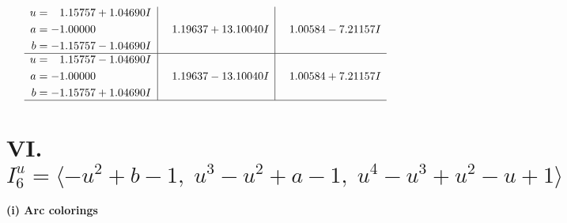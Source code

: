\documentclass[1p]{elsarticle_modified}
\theoremstyle{definition}
\begin{document}
$$\begin{array}{c|c|c}
\begin{aligned}
u &= \phantom{-}1.15757 + 1.04690 I \\
a &= -1.00000\phantom{ +0.000000I} \\
b &= -1.15757 - 1.04690 I\end{aligned}
 & \phantom{-}1.19637 + 13.10040 I & \phantom{-}1.00584 - 7.21157 I \\ \hline\begin{aligned}
u &= \phantom{-}1.15757 - 1.04690 I \\
a &= -1.00000\phantom{ +0.000000I} \\
b &= -1.15757 + 1.04690 I\end{aligned}
 & \phantom{-}1.19637 - 13.10040 I & \phantom{-}1.00584 + 7.21157 I\\
 \hline 
 \end{array}$$\newpage\newpage\renewcommand{\arraystretch}{1}
\centering \section*{VI. $I^u_{6}= \langle - u^2+b-1,\;u^3- u^2+a-1,\;u^4- u^3+u^2- u+1 \rangle$}
\flushleft \textbf{(i) Arc colorings}\\
\end{document}
